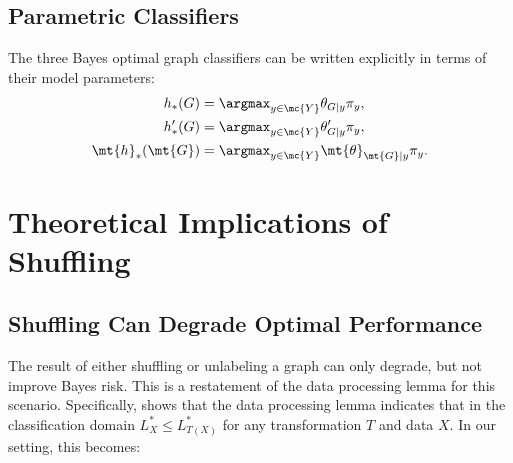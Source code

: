 \documentclass[10pt,journal,cspaper,compsoc]{IEEEtran}
\begin{document}

\subsection{Parametric Classifiers} %
\label{sub:parametric_classifiers}


The three Bayes optimal graph classifiers can be written explicitly in terms of their model parameters:
\begin{align}
	h_*(G) &= \argmax_{y \in \mc{Y}} \theta_{G|y}\pi_y, \label{eq:La_Bayes} \\
	h_*'(G) &= \argmax_{y \in \mc{Y}} \theta_{G|y}' \pi_y,  \label{eq:Sh_Bayes} \\
	\mt{h}_*(\mt{G}) &= \argmax_{y \in \mc{Y}}  \mt{\theta}_{\mt{G}|y}\pi_y. \label{eq:Un_Bayes}
\end{align}




\section{Theoretical Implications of Shuffling} %
\label{sec:theoretical_results}

\subsection{Shuffling Can Degrade Optimal Performance} %
\label{sec:shuffle}





The result of either shuffling or unlabeling a graph can only degrade, but not improve Bayes risk.  This is a restatement of the data processing lemma for this scenario. Specifically, \cite{Devroye1996} shows that the data processing lemma indicates that in the classification domain $L^*_X \leq L^*_{T(X)}$ for any transformation $T$ and data $X$.  In our setting, this becomes:
\end{document}
